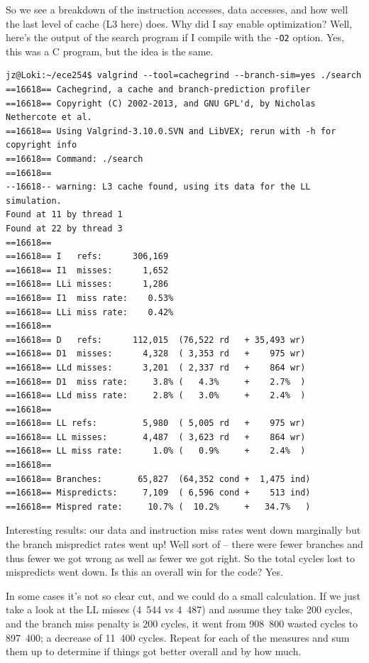 So we see a breakdown of the instruction accesses, data accesses, and how well the last level of cache (L3 here) does.  Why did I say enable optimization? Well, here's the output of the search program if I compile with the \texttt{-O2} option. Yes, this was a C program, but the idea is the same.

\begin{lstlisting}
jz@Loki:~/ece254$ valgrind --tool=cachegrind --branch-sim=yes ./search
==16618== Cachegrind, a cache and branch-prediction profiler
==16618== Copyright (C) 2002-2013, and GNU GPL'd, by Nicholas Nethercote et al.
==16618== Using Valgrind-3.10.0.SVN and LibVEX; rerun with -h for copyright info
==16618== Command: ./search
==16618== 
--16618-- warning: L3 cache found, using its data for the LL simulation.
Found at 11 by thread 1 
Found at 22 by thread 3 
==16618== 
==16618== I   refs:      306,169
==16618== I1  misses:      1,652
==16618== LLi misses:      1,286
==16618== I1  miss rate:    0.53%
==16618== LLi miss rate:    0.42%
==16618== 
==16618== D   refs:      112,015  (76,522 rd   + 35,493 wr)
==16618== D1  misses:      4,328  ( 3,353 rd   +    975 wr)
==16618== LLd misses:      3,201  ( 2,337 rd   +    864 wr)
==16618== D1  miss rate:     3.8% (   4.3%     +    2.7%  )
==16618== LLd miss rate:     2.8% (   3.0%     +    2.4%  )
==16618== 
==16618== LL refs:         5,980  ( 5,005 rd   +    975 wr)
==16618== LL misses:       4,487  ( 3,623 rd   +    864 wr)
==16618== LL miss rate:      1.0% (   0.9%     +    2.4%  )
==16618== 
==16618== Branches:       65,827  (64,352 cond +  1,475 ind)
==16618== Mispredicts:     7,109  ( 6,596 cond +    513 ind)
==16618== Mispred rate:     10.7% (  10.2%     +   34.7%   )
\end{lstlisting}

Interesting results: our data and instruction miss rates went down marginally but the branch mispredict rates went up! Well sort of -- there were fewer branches and thus fewer we got wrong as well as fewer we got right. So the total cycles lost to mispredicts went down. Is this an overall win for the code? Yes. 

In some cases it's not so clear cut, and we could do a small calculation. If we just take a look at the LL misses (4~544 vs 4~487) and assume they take 200 cycles, and the branch miss penalty is 200 cycles, it went from 908~800 wasted cycles to 897~400; a decrease of 11~400 cycles. Repeat for each of the measures and sum them up to determine if things got better overall and by how much.

